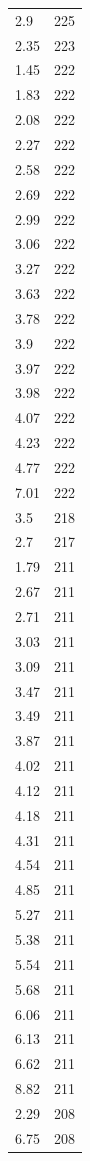 \begin{table}[ht]
\begin{tabular}{lr}
  2.9 & 225 \\ 
  2.35 & 223 \\ 
  1.45 & 222 \\ 
  1.83 & 222 \\ 
  2.08 & 222 \\ 
  2.27 & 222 \\ 
  2.58 & 222 \\ 
  2.69 & 222 \\ 
  2.99 & 222 \\ 
  3.06 & 222 \\ 
  3.27 & 222 \\ 
  3.63 & 222 \\ 
  3.78 & 222 \\ 
  3.9 & 222 \\ 
  3.97 & 222 \\ 
  3.98 & 222 \\ 
  4.07 & 222 \\ 
  4.23 & 222 \\ 
  4.77 & 222 \\ 
  7.01 & 222 \\ 
  3.5 & 218 \\ 
  2.7 & 217 \\ 
  1.79 & 211 \\ 
  2.67 & 211 \\ 
  2.71 & 211 \\ 
  3.03 & 211 \\ 
  3.09 & 211 \\ 
  3.47 & 211 \\ 
  3.49 & 211 \\ 
  3.87 & 211 \\ 
  4.02 & 211 \\ 
  4.12 & 211 \\ 
  4.18 & 211 \\ 
  4.31 & 211 \\ 
  4.54 & 211 \\ 
  4.85 & 211 \\ 
  5.27 & 211 \\ 
  5.38 & 211 \\ 
  5.54 & 211 \\ 
  5.68 & 211 \\ 
  6.06 & 211 \\ 
  6.13 & 211 \\ 
  6.62 & 211 \\ 
  8.82 & 211 \\ 
  2.29 & 208 \\ 
  6.75 & 208 \\ 

\end{tabular}
\end{table}
